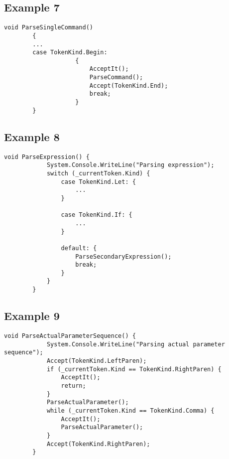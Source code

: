 \documentclass{article}
\begin{document}
\subsection{Example 7}
\begin{lstlisting}
void ParseSingleCommand()
        {
        ...
        case TokenKind.Begin:
                    {
                        AcceptIt();
                        ParseCommand();
                        Accept(TokenKind.End);
                        break;
                    }
		}
\end{lstlisting}

\subsection{Example 8}
\begin{lstlisting}
void ParseExpression() {
            System.Console.WriteLine("Parsing expression");
            switch (_currentToken.Kind) {
                case TokenKind.Let: {
					...
                }

                case TokenKind.If: {
					...
                }

                default: {
                    ParseSecondaryExpression();
                    break; 
                }
            }
        }
\end{lstlisting}

\subsection{Example 9}
\begin{lstlisting}
void ParseActualParameterSequence() {
            System.Console.WriteLine("Parsing actual parameter sequence");
            Accept(TokenKind.LeftParen);
            if (_currentToken.Kind == TokenKind.RightParen) {
                AcceptIt();
                return;
            }
            ParseActualParameter();
            while (_currentToken.Kind == TokenKind.Comma) {
                AcceptIt();
                ParseActualParameter();
            }
            Accept(TokenKind.RightParen);
        }
\end{lstlisting}
\end{document}
